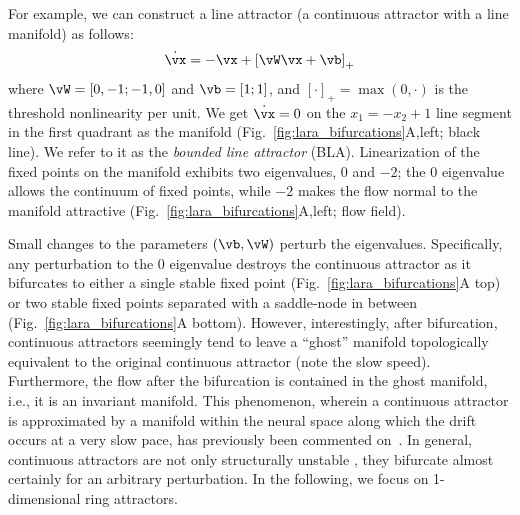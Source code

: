 \documentclass{article} %
\newcounter{ct}
\newcommand{\reals}{\mathbb{R}}
\theoremstyle{definition}
\theoremstyle{remark}
\begin{document}
For example, we can construct a line attractor (a continuous attractor with a line manifold) as follows:
\begin{align}\label{eq:TLN}
    \dot{\vx} = -\vx + \left[ \vW \vx + \vb \right]_{+}
\end{align}
where \(\vW = [0, -1; -1, 0]\) and \(\vb = [1; 1]\), and \([\cdot]_{+} = \max(0,\cdot)\) is the threshold nonlinearity per unit.
We get \(\dot{\vx} = 0\) on the \(x_1 = -x_2 + 1\) line segment in the first quadrant as the manifold (Fig.~\ref{fig:lara_bifurcations}A,left; black line).
We refer to it as the \emph{bounded line attractor} (BLA).
Linearization of the fixed points on the manifold exhibits two eigenvalues, \(0\) and \(-2\);
the \(0\) eigenvalue allows the continuum of fixed points, while \(-2\) makes the flow normal to the manifold attractive (Fig.~\ref{fig:lara_bifurcations}A,left; flow field).

Small changes to the parameters \((\vb,\vW)\) perturb the eigenvalues.
Specifically, any perturbation to the \(0\) eigenvalue destroys the continuous attractor as it bifurcates to either
a single stable fixed point (Fig.~\ref{fig:lara_bifurcations}A top) or two stable fixed points separated with a saddle-node in between (Fig.~\ref{fig:lara_bifurcations}A bottom).
However, interestingly, after bifurcation, continuous attractors seemingly tend to leave a ``ghost'' manifold topologically equivalent to the original continuous attractor (note the slow speed).
Furthermore, the flow after the bifurcation is contained in the ghost manifold, i.e., it is an invariant manifold.
This phenomenon, wherein a continuous attractor is approximated by a manifold within the neural space along which the drift occurs at a very slow pace, has previously been commented on~\citep{seung1997learning,mante2013context}.
In general, continuous attractors are not only structurally unstable \citep{mane1987proof}, they bifurcate almost certainly for an arbitrary perturbation.
In the following, we focus on 1-dimensional ring attractors.
\end{document}
